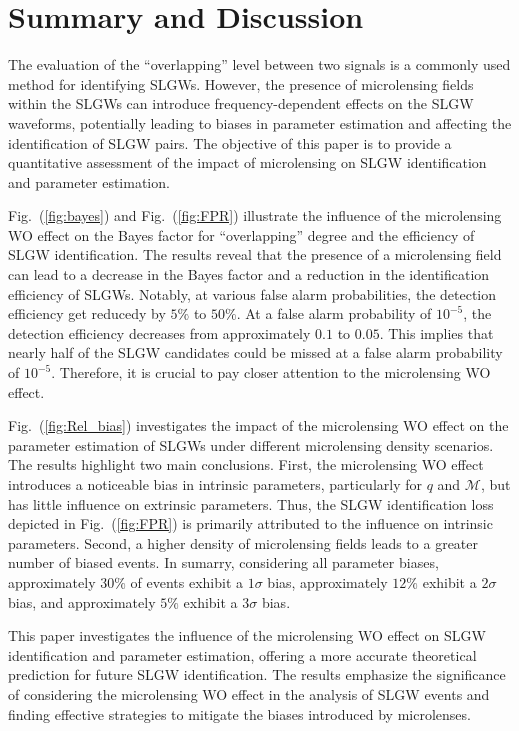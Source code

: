 \documentclass[fleqn,usenatbib]{mnras}
\begin{document}
\section{Summary and Discussion}
\label{sec:sum_dis}
The evaluation of the ``overlapping'' level between two signals is a commonly used method for identifying SLGWs. 
However, the presence of microlensing fields within the SLGWs can introduce frequency-dependent effects on the SLGW waveforms, potentially leading to biases in parameter estimation and affecting the identification of SLGW pairs. 
The objective of this paper is to provide a quantitative assessment of the impact of microlensing on SLGW identification and parameter estimation.

Fig.~(\ref{fig:bayes}) and Fig.~(\ref{fig:FPR}) illustrate the influence of the microlensing WO effect on the Bayes factor for ``overlapping'' degree and the efficiency of SLGW identification. 
The results reveal that the presence of a microlensing field can lead to a decrease in the Bayes factor and a reduction in the identification efficiency of SLGWs. 
Notably, at various false alarm probabilities, the detection efficiency get reducedy by $5\%$ to $50\%$. At a false alarm probability of $10^{-5}$, the detection efficiency decreases from approximately $0.1$ to $0.05$. 
This implies that nearly half of the SLGW candidates could be missed at a false alarm probability of $10^{-5}$. 
Therefore, it is crucial to pay closer attention to the microlensing WO effect.

Fig.~(\ref{fig:Rel_bias}) investigates the impact of the microlensing WO effect on the parameter estimation of SLGWs under different microlensing density scenarios. 
The results highlight two main conclusions. 
First, the microlensing WO effect introduces a noticeable bias in intrinsic parameters, particularly for $q$ and $\mathcal{M}$, but has little influence on extrinsic parameters. 
Thus, the SLGW identification loss depicted in Fig.~(\ref{fig:FPR}) is primarily attributed to the influence on intrinsic parameters. 
Second, a higher density of microlensing fields leads to a greater number of biased events. 
In sumarry, considering all parameter biases, approximately $30\%$ of events exhibit a $1\sigma$ bias, approximately $12\%$ exhibit a $2\sigma$ bias, and approximately $5\%$ exhibit a $3\sigma$ bias.

This paper investigates the influence of the microlensing WO effect on SLGW identification and parameter estimation, offering a more accurate theoretical prediction for future SLGW identification. 
The results emphasize the significance of considering the microlensing WO effect in the analysis of SLGW events and finding effective strategies to mitigate the biases introduced by microlenses.
\end{document}
